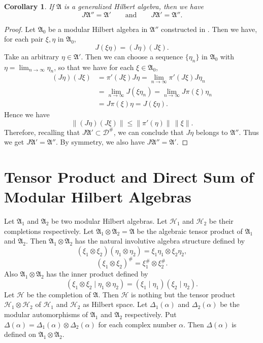 \documentclass[12pt,b5paper,twoside]{article}
\theoremstyle{takesaki}
\newtheorem{corollary}{Corollary}[section]
\numberwithin{equation}{section}
\begin{document}
\begin{corollary}\label{cor:10.1}
If $\mathfrak A$ is a generalized Hilbert algebra, then we have
\begin{equation}
  J\mathfrak A''=\mathfrak A'
  \qquad\text{and}\qquad
  J\mathfrak A'=\mathfrak A''.
  \tag{10.3}\label{eq:10.3}
\end{equation}
\end{corollary}

\begin{proof}
Let $\mathfrak A_0$ be a modular Hilbert algebra in $\mathfrak A''$
constructed in .  Then we have, for each pair
$\xi,\eta$ in $\mathfrak A_0$,
\[
  J(\xi\eta)=(J\eta)(J\xi).
\]
Take an arbitrary $\eta\in\mathfrak A'$.  Then we can choose a
sequence $\{\eta_n\}$ in $\mathfrak A_0$ with
$\eta=\lim_{n\to\infty}\eta_n$, so that we have for each
$\xi\in\mathfrak A_0$,
\begin{align*}
 (J\eta)(J\xi)
 &=\pi'(J\xi)J\eta
   =\lim_{n\to\infty}\pi'(J\xi)J\eta_n\\
 &=\lim_{n\to\infty}J(\xi\eta_n)
   =\lim_{n\to\infty}J\pi(\xi)\eta_n\\
 &=J\pi(\xi)\eta=J(\xi\eta).
\end{align*}
Hence we have
\[
  \|(J\eta)(J\xi)\|\leq\|\pi'(\eta)\|\,\|\xi\|.
\]
Therefore, recalling that $J\mathfrak A'\subset\mathcal D^{\#}$, we
can conclude that $J\eta$ belongs to $\mathfrak A''$.  Thus we get
$J\mathfrak A'=\mathfrak A''$.  By symmetry, we also have
$J\mathfrak A''=\mathfrak A'$.
\end{proof}

\section{Tensor Product and Direct Sum of Modular Hilbert Algebras}
\label{sec:11}

Let $\mathfrak A_1$ and $\mathfrak A_2$ be two modular Hilbert
algebras.  Let $\mathcal H_1$ and $\mathcal H_2$ be their completions
respectively.  Let $\mathfrak A_1\otimes\mathfrak A_2=\mathfrak A$ be
the algebraic tensor product of $\mathfrak A_1$ and
$\mathfrak A_2$.  Then $\mathfrak A_1\otimes\mathfrak A_2$ has the
natural involutive algebra structure defined by
\[
 (\xi_1\otimes\xi_2)(\eta_1\otimes\eta_2)
 =\xi_1\eta_1\otimes\xi_2\eta_2,
\]
\[
 (\xi_1\otimes\xi_2)^{\#}
 =\xi_1^{\#}\otimes\xi_2^{\#}.
\]
Also $\mathfrak A_1\otimes\mathfrak A_2$ has the inner product defined
by
\[
 (\xi_1\otimes\xi_2\mid\eta_1\otimes\eta_2)
 =(\xi_1\mid\eta_1)(\xi_2\mid\eta_2).
\]
Let $\mathcal H$ be the completion of $\mathfrak A$.  Then
$\mathcal H$ is nothing but the tensor product
$\mathcal H_1\otimes\mathcal H_2$ of $\mathcal H_1$ and
$\mathcal H_2$ as Hilbert space.  Let $\Delta_1(\alpha)$ and
$\Delta_2(\alpha)$ be the modular automorphisms of $\mathfrak A_1$
and $\mathfrak A_2$ respectively.  Put
$\Delta(\alpha)=\Delta_1(\alpha)\otimes\Delta_2(\alpha)$ for each
complex number $\alpha$.  Then $\Delta(\alpha)$ is defined on
$\mathfrak A_1\otimes\mathfrak A_2$.
\end{document}
